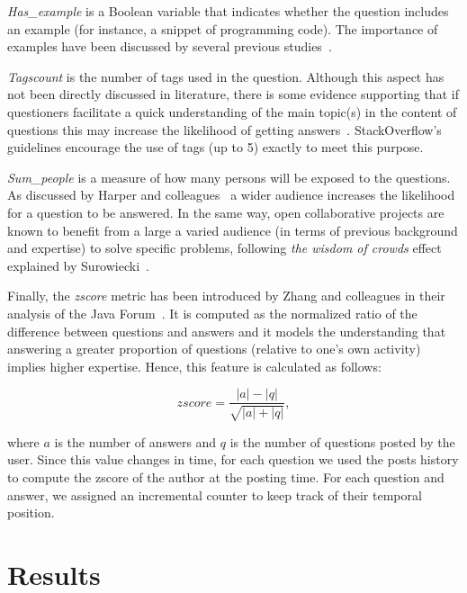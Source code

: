 \documentclass{chi2012}
\begin{document}
\textit{Has\_example} is a Boolean variable that indicates whether the question 
includes an example (for instance, a snippet of programming code). The importance 
of examples have been discussed by several previous studies~\cite{asaduzzaman2013,
mamykina2011,treude2011}. 

\textit{Tagscount} is the number of tags used in the question.
Although this aspect has not been directly discussed in literature, there is 
some evidence supporting that if questioners facilitate a quick understanding of the 
main topic(s) in the content of questions this may increase the likelihood of 
getting answers~\cite{treude2011,asaduzzaman2013}. StackOverflow’s 
guidelines encourage the use of tags (up to 5) exactly to meet this purpose.

\textit{Sum\_people} is a measure of how many persons will be exposed to 
the questions. As discussed by Harper and colleagues~\cite{harper2008} a 
wider audience increases the likelihood for a question to be answered. In the same
way, open collaborative projects are known to benefit from a large a varied
audience (in terms of previous background and expertise) to solve specific
problems, following \textit{the wisdom of crowds} effect explained by
Surowiecki~\cite{surowiecki2005}.

Finally, the \textit{zscore} metric has been introduced by Zhang and 
colleagues in their analysis of the Java Forum~\cite{zhang2007}. It is 
computed as the normalized ratio of the difference between questions and answers 
and it models the understanding that answering a greater proportion of 
questions (relative to one’s own activity) implies higher expertise. 
Hence, this feature is calculated as follows:

\begin{equation}
zscore = \frac{|a|-|q|}{\sqrt{|a|+|q|}},
\label{eq:zscore}
\end{equation}

where $a$ is the number of answers and $q$ is the number of questions posted by the user.
Since this value changes in time, for each question we used the posts history to compute 
the zscore of the author at the posting time. For each question and answer, we assigned 
an incremental counter to keep track of their temporal position.\\

\section{Results}
\end{document}

